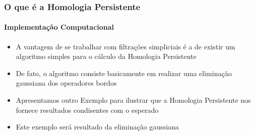\documentclass[11pt]{beamer}
\theoremstyle{remark}
\theoremstyle{definition}
\theoremstyle{plain}
\begin{document}
    \begin{frame}
        \frametitle{O que é a Homologia Persistente}
        \framesubtitle{Implementação Computacional}
        \begin{itemize}
            \item
                A vantagem de se trabalhar com filtrações simpliciais
                é a de existir um algoritmo simples para o cálculo
                da Homologia Persistente

            \item
                De fato, o algoritmo consiste basicamente em realizar
                uma eliminação gaussiana dos operadores bordos

            \item
                Apresentamos outro Exemplo  para ilustrar que
                a Homologia Persistente nos fornece resultados
                condisentes com o esperado

            \item 
                Este exemplo será resultado da eliminação gaussiana
        \end{itemize}
    \end{frame}
\end{document}
